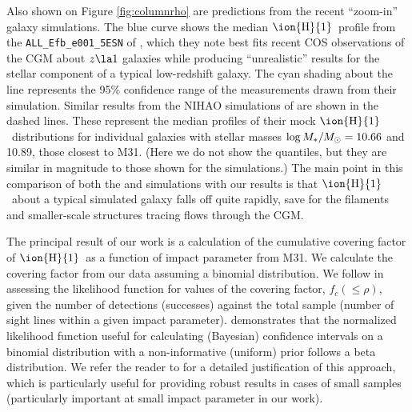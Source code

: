 \documentclass[12pt,preprint]{aastex6}
\newcommand{\HI}{\ensuremath{\mbox{\ion{H}{1}}}}
\newcommand{\msun}{\ensuremath{M_\odot}\relax}
\newcommand{\fccum}{\ensuremath{f_c(\le \rho)}\relax}
\begin{document}
Also shown on Figure \ref{fig:columnrho} are predictions from the
recent ``zoom-in'' galaxy simulations. The blue curve shows the median
\HI\ profile from the {\tt ALL\_Efb\_e001\_5ESN} of \citet{liang2016},
which they note best fits recent COS observations of the CGM about
$z\la1$ galaxies while producing ``unrealistic'' results for the
stellar component of a typical low-redshift galaxy. The cyan shading
about the line represents the 95\% confidence range of the
measurements drawn from their simulation. Similar results from the
NIHAO simulations of \citet{gutcke2016} are shown in the dashed
lines. These represent the median profiles of their mock \HI\
distributions for individual galaxies with stellar masses
$\log M_*/\msun = 10.66$ and 10.89, those closest to M31. (Here we do
not show the quantiles, but they are similar in magnitude to those
shown for the \citeauthor{liang2016} simulations.)  The main point in
this comparison of both the \citeauthor{liang2016} and
\citeauthor{gutcke2016} simulations with our results is that \HI\
about a typical simulated galaxy falls off quite rapidly, save for the
filaments and smaller-scale structures tracing flows through the CGM.

The principal result of our work is a calculation of the cumulative
covering factor of \HI\ as a function of impact parameter from M31.
We calculate the covering factor from our data assuming a binomial
distribution. We follow \citet{cameron2011} in assessing the
likelihood function for values of the covering factor, \fccum, given
the number of detections (successes) against the total sample (number
of sight lines within a given impact
parameter). \citeauthor{cameron2011} demonstrates that the normalized
likelihood function useful for calculating (Bayesian) confidence
intervals on a binomial distribution with a non-informative (uniform)
prior follows a beta distribution.  We refer the reader to
\citet{cameron2011} for a detailed justification of this approach,
which is particularly useful for providing robust results in cases of
small samples (particularly important at small impact parameter in our
work).
\end{document}
